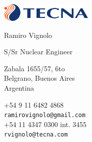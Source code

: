 \documentclass{article}
\begin{document}
\AddToShipoutPicture{\BackgroundPic}


\vspace{0.5cm plus \chico minus \chico}

\begin{minipage}{0.3\linewidth}
\par\vspace{\chico}
\par\vspace{\chico}
\par\vspace{\chico}
\vspace{1cm}
\end{minipage}
\begin{minipage}{0.4\linewidth}

\begin{center}
\href{http://www.tecna.com}{\includegraphics[width=4.5cm]{logos/logo-tecna}}\\

\smallskip

\textsf{Ramiro Vignolo}
\par
\textsf{S/Sr Nuclear Engineer}
\end{center}

\smallskip

\hspace{1.25cm}
\begin{minipage}{7cm}
Zabala 1655/57, 6to\\
Belgrano, Buenos Aires\\
Argentina
\end{minipage}

\begin{center}
+54 9 11 6482 4868\\
\textcolor{azul}{\texttt{ramirovignolo@gmail.com}}\\

+54 11 4347 0300 int. 3455\\
\textcolor{azul}{\texttt{rvignolo@tecna.com}}

\end{center}
\end{minipage}
\end{document}

